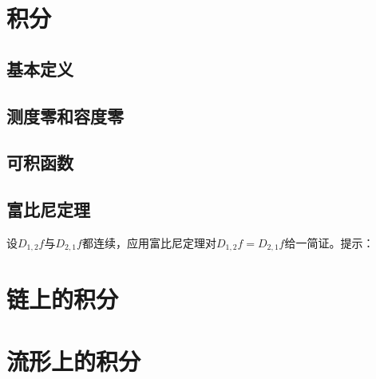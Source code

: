 \chapter{积分}\label{chapter00903}
\section{基本定义}\label{section0090301}





\section{测度零和容度零}\label{section0090302}


\section{可积函数}\label{section0090303}


\section{富比尼定理}\label{section0090304}

\begin{problemset}
\item\label{exer009030328} 设$D_{1,2}f$与$D_{2,1}f$都连续，应用富比尼定理对$D_{1,2}f = D_{2,1}f$给一简证。提示：

\end{problemset}



\chapter{链上的积分}\label{chapter00904}




\chapter{流形上的积分}\label{chapter00905}

